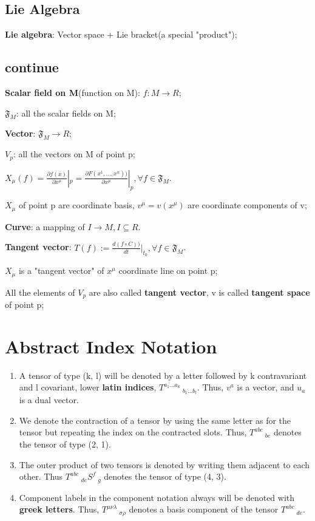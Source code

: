 \documentclass[12pt]{article}
\numberwithin{equation}{section}
\begin{document}
\subsection{Lie Algebra}
	\textbf{Lie algebra}: Vector space + Lie bracket(a special "product");	
\subsection{continue}
	\textbf{Scalar field on M}(function on M): $f:M \rightarrow R$; \par
	$\mathfrak{F}_M$: all the scalar fields on M; \par
	\textbf{Vector}: $\mathfrak{F}_M\rightarrow R$; \par
	$V_p$: all the vectors on M of point p; \par
	$X_\mu(f)=\frac{\partial f(x)}{\partial x^\mu}|_p = \frac{\partial F(x^1,...,x^n))}{\partial x^\mu}|_p, \forall f \in \mathfrak{F}_M$. \par
	${X_\mu}$ of point p are coordinate basis, $v^\mu=v(x^\mu)$ are coordinate components of v;\par
	\textbf{Curve}: a mapping of $I\rightarrow M, I\subseteq R$.\par
	\textbf{Tangent vector}: $T(f):=\frac{d(f\circ C))}{dt}|_{t_0}, \forall f \in \mathfrak{F}_M$.\par
	$X_\mu$ is a "tangent vector" of $x^\mu$ coordinate line on point p;\par
	All the elements of $V_p$ are also called \textbf{tangent vector}, v is called \textbf{tangent space} of point p;
\section{Abstract Index Notation}
\begin{enumerate}
	\item A tensor of type (k, l) will be denoted by a letter followed by k contravariant and l covariant, lower \textbf{latin indices}, $T^{a_1...a_k}\ _{b_1...b_l}$. Thus, $v^a$ is a vector, and $u_a$ is a dual vector.
	\item We denote the contraction of a tensor by using the same letter as for the tensor but repeating the index on the contracted slots. Thus, $T^{abc}\ _{be}$ denotes the tensor of type (2, 1).
	\item The outer product of two tensors is denoted by writing them adjacent to each other. Thus $T^{abc}\ _{de}S^f\ _g$ denotes the tensor of type (4, 3).
	\item Component labels in the component notation always will be denoted with \textbf{greek letters}. Thus, $T^{\mu\nu\lambda}\ _{\sigma\rho}$ denotes a basis component of the tensor $T^{abc}\ _{de}$.
\end{enumerate}
\renewcommand\refname{Reference}

 
\clearpage
\end{document}
